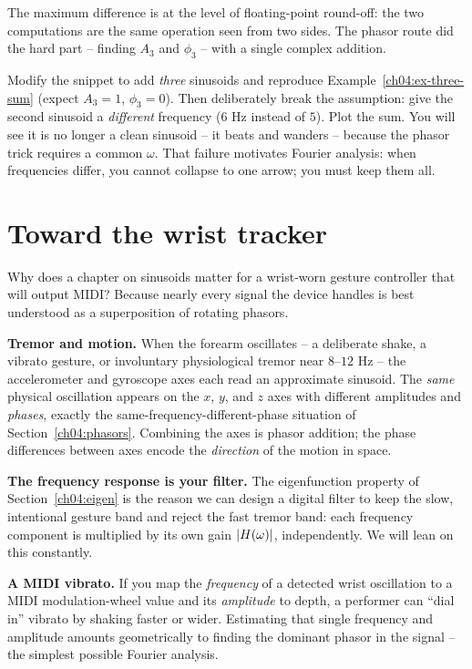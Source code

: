 The maximum difference is at the level of floating-point round-off: the two computations are the
same operation seen from two sides. The phasor route did the hard part -- finding $A_3$ and
$\phi_3$ -- with a single complex addition.

\begin{labbox}
Modify the snippet to add \emph{three} sinusoids and reproduce Example~\ref{ch04:ex-three-sum}
(expect $A_3 = 1$, $\phi_3 = 0$). Then deliberately break the assumption: give the second sinusoid
a \emph{different} frequency ($6$ Hz instead of $5$). Plot the sum. You will see it is no longer a
clean sinusoid -- it beats and wanders -- because the phasor trick requires a common $\omega$. That
failure motivates Fourier analysis: when frequencies differ, you cannot collapse
to one arrow; you must keep them all.
\end{labbox}

\section{Toward the wrist tracker}
\label{ch04:goal}

\begin{goalbox}
Why does a chapter on sinusoids matter for a wrist-worn gesture controller that will output MIDI?
Because nearly every signal the device handles is best understood as a superposition of rotating
phasors.

\textbf{Tremor and motion.} When the forearm oscillates -- a deliberate shake, a vibrato gesture,
or involuntary physiological tremor near $8$--$12$ Hz -- the accelerometer and gyroscope axes each
read an approximate sinusoid. The \emph{same} physical oscillation appears on the $x$, $y$, and $z$
axes with different amplitudes and \emph{phases}, exactly the same-frequency-different-phase
situation of Section~\ref{ch04:phasors}. Combining the axes is phasor addition; the phase
differences between axes encode the \emph{direction} of the motion in space.

\textbf{The frequency response is your filter.} The eigenfunction property of
Section~\ref{ch04:eigen} is the reason we can design a digital filter to keep the slow,
intentional gesture band and reject the fast tremor band: each frequency component is multiplied by
its own gain $\lvert H(\omega)\rvert$, independently. We will lean on this constantly.

\textbf{A MIDI vibrato.} If you map the \emph{frequency} of a detected wrist oscillation to a MIDI
modulation-wheel value and its \emph{amplitude} to depth, a performer can ``dial in'' vibrato by
shaking faster or wider. Estimating that single frequency and amplitude amounts geometrically to finding the
dominant phasor in the signal -- the simplest possible Fourier analysis.
\end{goalbox}

